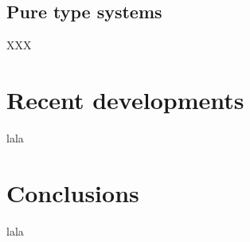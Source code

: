 \documentclass[12pt,toc=bibliography,numbers=noendperiod,
               footnotes=multiple,twoside]{scrartcl}
\begin{document}
\subsection{Pure type systems}

XXX

\section{Recent developments}
lala

\section{Conclusions}
lala

\printbibliography
\end{document}
